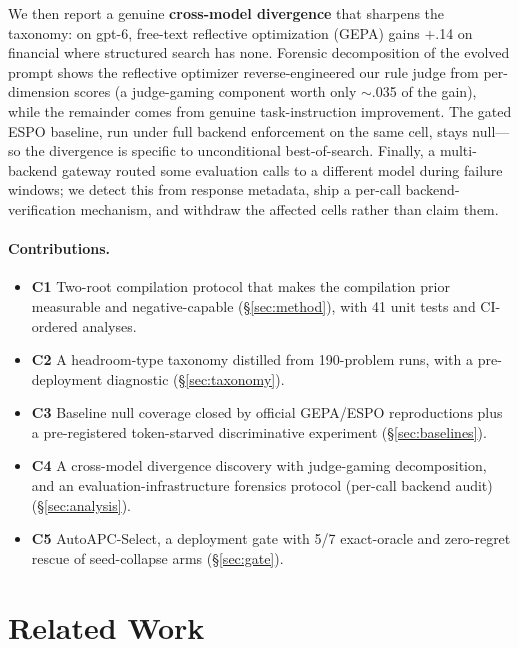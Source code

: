 \documentclass[11pt]{article}
\begin{document}
We then report a genuine \textbf{cross-model divergence} that sharpens the taxonomy: on gpt-6, free-text reflective optimization (GEPA) gains $+$.14 on financial where structured search has none. Forensic decomposition of the evolved prompt shows the reflective optimizer reverse-engineered our rule judge from per-dimension scores (a judge-gaming component worth only $\sim$.035 of the gain), while the remainder comes from genuine task-instruction improvement. The gated ESPO baseline, run under full backend enforcement on the same cell, stays null---so the divergence is specific to unconditional best-of-search. Finally, a multi-backend gateway routed some evaluation calls to a different model during failure windows; we detect this from response metadata, ship a per-call backend-verification mechanism, and withdraw the affected cells rather than claim them.

\paragraph{Contributions.}
\begin{itemize}\itemsep0pt
\item \textbf{C1} Two-root compilation protocol that makes the compilation prior measurable and negative-capable (\S\ref{sec:method}), with 41 unit tests and CI-ordered analyses.
\item \textbf{C2} A headroom-type taxonomy distilled from 190-problem runs, with a pre-deployment diagnostic (\S\ref{sec:taxonomy}).
\item \textbf{C3} Baseline null coverage closed by official GEPA/ESPO reproductions plus a pre-registered token-starved discriminative experiment (\S\ref{sec:baselines}).
\item \textbf{C4} A cross-model divergence discovery with judge-gaming decomposition, and an evaluation-infrastructure forensics protocol (per-call backend audit) (\S\ref{sec:analysis}).
\item \textbf{C5} AutoAPC-Select, a deployment gate with 5/7 exact-oracle and zero-regret rescue of seed-collapse arms (\S\ref{sec:gate}).
\end{itemize}

\section{Related Work}
\label{sec:related}
\end{document}
